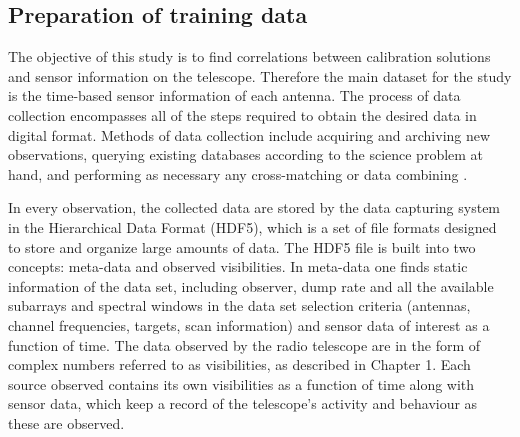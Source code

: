 \subsection{Preparation of training data}\label{prep}

The objective of this study is to find correlations between
calibration solutions and sensor information on the telescope.
Therefore the main dataset for the study is the time-based
sensor information of each antenna.
The process of data collection encompasses all of the steps required to obtain the desired data in digital format. Methods of data collection include acquiring and archiving new observations, querying existing databases according to the science
problem at hand, and performing as necessary any cross-matching or data combining  \citep{ball2010data}.


In every observation, the collected data are stored by the data capturing system in the Hierarchical Data Format (HDF5), which is a set of file formats designed to store and organize large amounts of data. The HDF5 file is built into two concepts: meta-data and observed visibilities. In meta-data one finds static information of the data set, including observer, dump rate and all the available subarrays and spectral windows in the data set selection criteria (antennas, channel frequencies, targets, scan information) and sensor data of interest as a function of time. The data observed by the radio telescope are in the  form of complex numbers referred to as visibilities, as described in Chapter 1. Each source observed contains its own visibilities as a function of time along with sensor data,  which keep a record of the telescope's activity and behaviour as these are observed.

